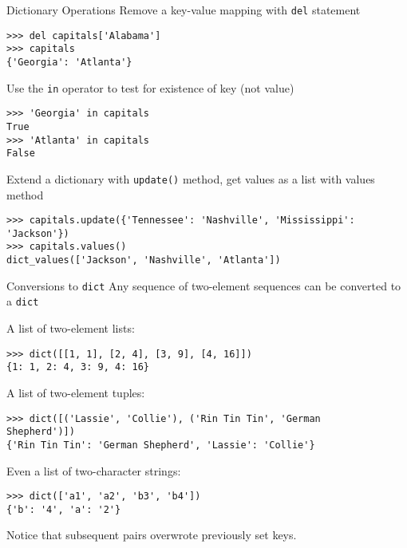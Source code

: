 \documentclass[smaller, aspectratio=1610]{beamer}
\begin{document}
\begin{frame}[label={sec:org5955066},fragile]{Dictionary Operations}
 Remove a key-value mapping with \texttt{del} statement

\lstset{language=Python,label= ,caption= ,captionpos=b,numbers=none}
\begin{lstlisting}
>>> del capitals['Alabama']
>>> capitals
{'Georgia': 'Atlanta'}
\end{lstlisting}

Use the \texttt{in} operator to test for existence of key (not value)

\lstset{language=Python,label= ,caption= ,captionpos=b,numbers=none}
\begin{lstlisting}
>>> 'Georgia' in capitals
True
>>> 'Atlanta' in capitals
False
\end{lstlisting}

Extend a dictionary with \texttt{update()} method, get values as a list
with values method

\lstset{language=Python,label= ,caption= ,captionpos=b,numbers=none}
\begin{lstlisting}
>>> capitals.update({'Tennessee': 'Nashville', 'Mississippi':
'Jackson'})
>>> capitals.values()
dict_values(['Jackson', 'Nashville', 'Atlanta'])
\end{lstlisting}
\end{frame}

\begin{frame}[label={sec:orgb8ee536},fragile]{Conversions to \texttt{dict}}
 Any sequence of two-element sequences can be converted to a \texttt{dict}

A list of two-element lists:

\lstset{language=Python,label= ,caption= ,captionpos=b,numbers=none}
\begin{lstlisting}
>>> dict([[1, 1], [2, 4], [3, 9], [4, 16]])
{1: 1, 2: 4, 3: 9, 4: 16}
\end{lstlisting}

A list of two-element tuples:


\lstset{language=Python,label= ,caption= ,captionpos=b,numbers=none}
\begin{lstlisting}
>>> dict([('Lassie', 'Collie'), ('Rin Tin Tin', 'German
Shepherd')])
{'Rin Tin Tin': 'German Shepherd', 'Lassie': 'Collie'}
\end{lstlisting}

Even a list of two-character strings:

\lstset{language=Python,label= ,caption= ,captionpos=b,numbers=none}
\begin{lstlisting}
>>> dict(['a1', 'a2', 'b3', 'b4'])
{'b': '4', 'a': '2'}
\end{lstlisting}

Notice that subsequent pairs overwrote previously set keys.
\end{frame}
\end{document}
